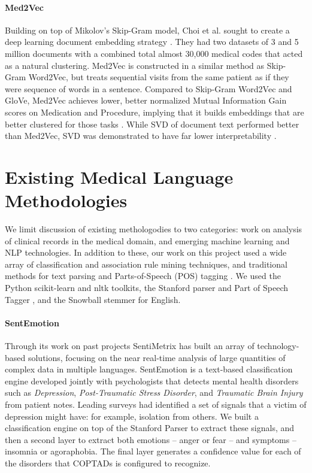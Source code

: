 \paragraph{Med2Vec} \label{sec:med2vec} Building on top of Mikolov's Skip-Gram model, Choi et al. sought to create a deep learning document embedding strategy \cite{med2vec}. They had two datasets of 3 and 5 million documents with a combined total almost 30,000 medical codes that acted as a natural clustering. \textsf{Med2Vec} is constructed in a similar method as \textsf{Skip-Gram Word2Vec}, but treats sequential visits from the same patient as if they were sequence of words in a sentence. Compared to \textsf{Skip-Gram Word2Vec} and \textsf{GloVe}, \textsf{Med2Vec} achieves lower, better normalized Mutual Information Gain scores on Medication and Procedure, implying that it builds embeddings that are better clustered for those tasks \cite{GloVe}. While \textsf{SVD} of document text performed better than \textsf{Med2Vec}, \textsf{SVD} was demonstrated to have far lower interpretability \cite{svd}. 

\section{Existing Medical Language Methodologies}

We limit discussion of existing methologodies to two categories:
work on analysis of clinical records in the medical domain, and emerging machine learning and NLP technologies.
In addition to these, our work on this project used a wide array of 
classification \cite{wu08} and association rule mining \cite{fpgrowth} techniques, and
traditional methods for text parsing and Parts-of-Speech (POS) tagging \cite{stanfordparser}. 
We used the Python \textsf{scikit-learn} \cite{scikit-learn} 
and \textsf{nltk} \cite{nltk} toolkits, the Stanford parser and Part of Speech Tagger \cite{stanfordparser}, and 
the Snowball stemmer for English\cite{snowball}. 

\paragraph{SentEmotion} 
Through its work on past projects \cite{dickerson14,kagan15,darpa} SentiMetrix has built an array of technology-based solutions, focusing on the near real-time analysis of large quantities of complex data in multiple languages. SentEmotion \cite{coptads-book,coptads} is a text-based classification engine developed jointly with psychologists that detects mental health disorders such as \textit{Depression}, \textit{Post-Traumatic Stress Disorder}, and \textit{Traumatic Brain Injury} from patient notes. Leading surveys had identified a set of signals that a victim of depression might have: for example, isolation from others. We built a classification engine on top of the Stanford Parser \cite{stanfordparser} to extract these signals, and then a second layer to extract both emotions -- anger or fear -- and symptoms -- insomnia or agoraphobia. The final layer generates a confidence value for each of the disorders that COPTADs is configured to recognize. 


